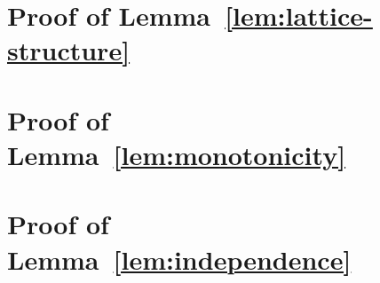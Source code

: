 \section{Proof of Lemma~\ref{lem:lattice-structure}}\label{section:lattice-structure-proof}


\section{Proof of Lemma~\ref{lem:monotonicity}}\label{section:monotonicity-proof}


\section{Proof of Lemma~\ref{lem:independence}}\label{section:independence-proof}

